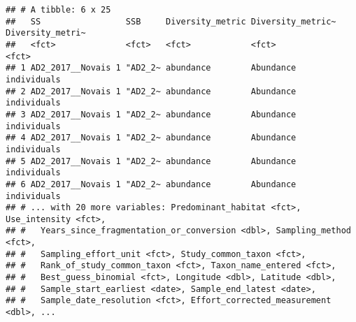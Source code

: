 \documentclass[
]{article}
\newenvironment{Shaded}{\begin{snugshade}}{\end{snugshade}}
\newcommand{\DecValTok}[1]{\textcolor[rgb]{0.00,0.00,0.81}{#1}}
\newcommand{\FunctionTok}[1]{\textcolor[rgb]{0.00,0.00,0.00}{#1}}
\newcommand{\NormalTok}[1]{#1}
\newcommand{\OtherTok}[1]{\textcolor[rgb]{0.56,0.35,0.01}{#1}}
\newcommand{\SpecialCharTok}[1]{\textcolor[rgb]{0.00,0.00,0.00}{#1}}
\begin{document}
\begin{Shaded}
\end{Shaded}

\begin{verbatim}
## # A tibble: 6 x 25
##   SS                 SSB     Diversity_metric Diversity_metric~ Diversity_metri~
##   <fct>              <fct>   <fct>            <fct>             <fct>           
## 1 AD2_2017__Novais 1 "AD2_2~ abundance        Abundance         individuals     
## 2 AD2_2017__Novais 1 "AD2_2~ abundance        Abundance         individuals     
## 3 AD2_2017__Novais 1 "AD2_2~ abundance        Abundance         individuals     
## 4 AD2_2017__Novais 1 "AD2_2~ abundance        Abundance         individuals     
## 5 AD2_2017__Novais 1 "AD2_2~ abundance        Abundance         individuals     
## 6 AD2_2017__Novais 1 "AD2_2~ abundance        Abundance         individuals     
## # ... with 20 more variables: Predominant_habitat <fct>, Use_intensity <fct>,
## #   Years_since_fragmentation_or_conversion <dbl>, Sampling_method <fct>,
## #   Sampling_effort_unit <fct>, Study_common_taxon <fct>,
## #   Rank_of_study_common_taxon <fct>, Taxon_name_entered <fct>,
## #   Best_guess_binomial <fct>, Longitude <dbl>, Latitude <dbl>,
## #   Sample_start_earliest <date>, Sample_end_latest <date>,
## #   Sample_date_resolution <fct>, Effort_corrected_measurement <dbl>, ...
\end{verbatim}
\end{document}
